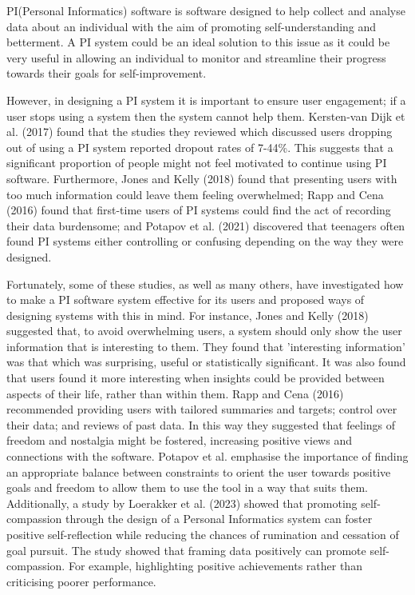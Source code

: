 \documentclass[12pt]{article}
\begin{document}
PI(Personal Informatics) software is software designed to help collect and
analyse data about an individual with the aim of promoting self-understanding
and betterment. A PI system could be an ideal solution to this issue as it
could be very useful in allowing an individual to monitor and streamline their
progress towards their goals for self-improvement.\par

However, in designing a PI system it is important to ensure user engagement; if
a user stops using a system then the system cannot help them. Kersten-van Dijk
et al. (2017) found that the studies they reviewed which discussed users
dropping out of using a PI system reported dropout rates of 7-44\%. This
suggests that a significant proportion of people might not feel motivated to
continue using PI software. Furthermore, Jones and Kelly (2018) found that
presenting users with too much information could leave them feeling
overwhelmed; Rapp and Cena (2016) found that first-time users of PI systems
could find the act of recording their data burdensome; and Potapov et al.
(2021) discovered that teenagers often found PI systems either controlling or
confusing depending on the way they were designed.\par

Fortunately, some of these studies, as well as many others, have investigated
how to make a PI software system effective for its users and proposed ways of
designing systems with this in mind. For instance, Jones and Kelly (2018)
suggested that, to avoid overwhelming users, a system should only show the user
information that is interesting to them. They found that 'interesting
information' was that which was surprising, useful or statistically
significant. It was also found that users found it more interesting when
insights could be provided between aspects of their life, rather than within
them. Rapp and Cena (2016) recommended providing users with tailored summaries
and targets; control over their data; and reviews of past data. In this way
they suggested that feelings of freedom and nostalgia might be fostered,
increasing positive views and connections with the software. Potapov et al.
emphasise the importance of finding an appropriate balance between constraints
to orient the user towards positive goals and freedom to allow them to use the
tool in a way that suits them. Additionally, a study by Loerakker et al. (2023)
showed that promoting self-compassion through the design of a Personal
Informatics system can foster positive self-reflection while reducing the
chances of rumination and cessation of goal pursuit. The study showed that
framing data positively can promote self-compassion. For example, highlighting
positive achievements rather than criticising poorer performance.\par
\end{document}

